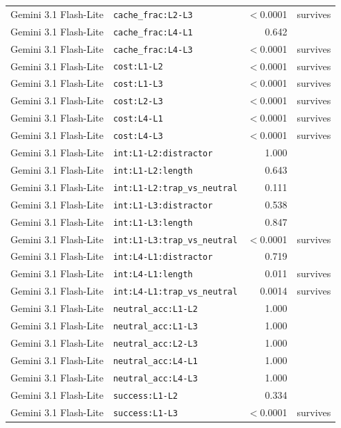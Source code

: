 \begin{longtable}{llrl}
Gemini 3.1 Flash-Lite & \texttt{cache\_frac:L2-L3} & $<$0.0001 & survives \\
Gemini 3.1 Flash-Lite & \texttt{cache\_frac:L4-L1} & 0.642 &  \\
Gemini 3.1 Flash-Lite & \texttt{cache\_frac:L4-L3} & $<$0.0001 & survives \\
Gemini 3.1 Flash-Lite & \texttt{cost:L1-L2} & $<$0.0001 & survives \\
Gemini 3.1 Flash-Lite & \texttt{cost:L1-L3} & $<$0.0001 & survives \\
Gemini 3.1 Flash-Lite & \texttt{cost:L2-L3} & $<$0.0001 & survives \\
Gemini 3.1 Flash-Lite & \texttt{cost:L4-L1} & $<$0.0001 & survives \\
Gemini 3.1 Flash-Lite & \texttt{cost:L4-L3} & $<$0.0001 & survives \\
Gemini 3.1 Flash-Lite & \texttt{int:L1-L2:distractor} & 1.000 &  \\
Gemini 3.1 Flash-Lite & \texttt{int:L1-L2:length} & 0.643 &  \\
Gemini 3.1 Flash-Lite & \texttt{int:L1-L2:trap\_vs\_neutral} & 0.111 &  \\
Gemini 3.1 Flash-Lite & \texttt{int:L1-L3:distractor} & 0.538 &  \\
Gemini 3.1 Flash-Lite & \texttt{int:L1-L3:length} & 0.847 &  \\
Gemini 3.1 Flash-Lite & \texttt{int:L1-L3:trap\_vs\_neutral} & $<$0.0001 & survives \\
Gemini 3.1 Flash-Lite & \texttt{int:L4-L1:distractor} & 0.719 &  \\
Gemini 3.1 Flash-Lite & \texttt{int:L4-L1:length} & 0.011 & survives \\
Gemini 3.1 Flash-Lite & \texttt{int:L4-L1:trap\_vs\_neutral} & 0.0014 & survives \\
Gemini 3.1 Flash-Lite & \texttt{neutral\_acc:L1-L2} & 1.000 &  \\
Gemini 3.1 Flash-Lite & \texttt{neutral\_acc:L1-L3} & 1.000 &  \\
Gemini 3.1 Flash-Lite & \texttt{neutral\_acc:L2-L3} & 1.000 &  \\
Gemini 3.1 Flash-Lite & \texttt{neutral\_acc:L4-L1} & 1.000 &  \\
Gemini 3.1 Flash-Lite & \texttt{neutral\_acc:L4-L3} & 1.000 &  \\
Gemini 3.1 Flash-Lite & \texttt{success:L1-L2} & 0.334 &  \\
Gemini 3.1 Flash-Lite & \texttt{success:L1-L3} & $<$0.0001 & survives \\

\end{longtable}
